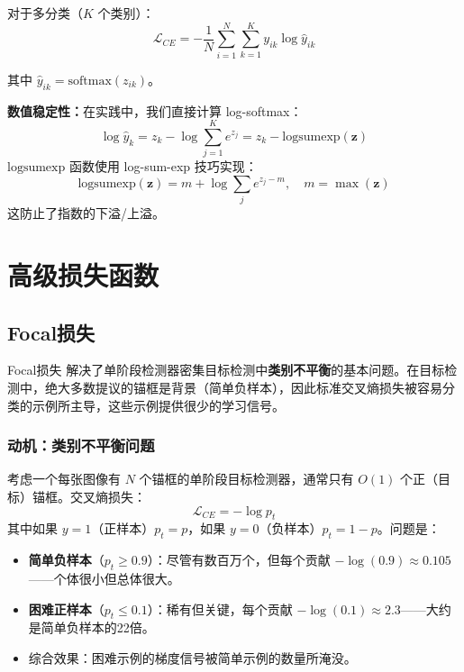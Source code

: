 对于多分类（$K$ 个类别）：
\begin{equation}
\mathcal{L}_{CE} = -\frac{1}{N}\sum_{i=1}^{N}\sum_{k=1}^{K} y_{ik} \log \hat{y}_{ik}
\end{equation}

其中 $\hat{y}_{ik} = \text{softmax}(z_{ik})$。

\textbf{数值稳定性：}在实践中，我们直接计算 log-softmax：
\begin{equation}
\log \hat{y}_k = z_k - \log \sum_{j=1}^{K} e^{z_j} = z_k - \text{logsumexp}(\mathbf{z})
\end{equation}
$\text{logsumexp}$ 函数使用 log-sum-exp 技巧实现：
\begin{equation}
\text{logsumexp}(\mathbf{z}) = m + \log \sum_{j} e^{z_j - m}, \quad m = \max(\mathbf{z})
\end{equation}
这防止了指数的下溢/上溢。

\section{高级损失函数}

\subsection{Focal损失}

Focal损失 \cite{lin2017focal} 解决了单阶段检测器密集目标检测中\textbf{类别不平衡}的基本问题。在目标检测中，绝大多数提议的锚框是背景（简单负样本），因此标准交叉熵损失被容易分类的示例所主导，这些示例提供很少的学习信号。

\subsubsection{动机：类别不平衡问题}

考虑一个每张图像有 $N$ 个锚框的单阶段目标检测器，通常只有 $O(1)$ 个正（目标）锚框。交叉熵损失：
\begin{equation}
\mathcal{L}_{CE} = -\log p_t
\end{equation}
其中如果 $y = 1$（正样本）$p_t = p$，如果 $y = 0$（负样本）$p_t = 1 - p$。问题是：
\begin{itemize}
    \item \textbf{简单负样本}（$p_t \geq 0.9$）：尽管有数百万个，但每个贡献 $-\log(0.9) \approx 0.105$——个体很小但总体很大。
    \item \textbf{困难正样本}（$p_t \leq 0.1$）：稀有但关键，每个贡献 $-\log(0.1) \approx 2.3$——大约是简单负样本的22倍。
    \item 综合效果：困难示例的梯度信号被简单示例的数量所淹没。
\end{itemize}

